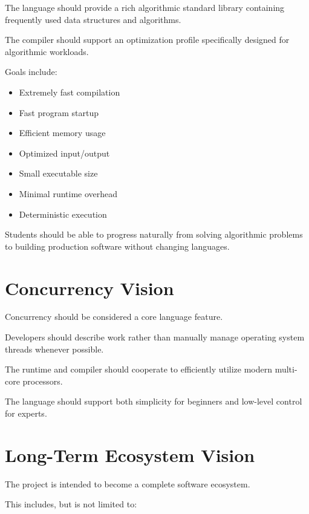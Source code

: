 \documentclass[12pt]{article}
\begin{document}
The language should provide a rich algorithmic standard library containing frequently used data structures and algorithms.

The compiler should support an optimization profile specifically designed for algorithmic workloads.

Goals include:

\begin{itemize}
    \item Extremely fast compilation
    \item Fast program startup
    \item Efficient memory usage
    \item Optimized input/output
    \item Small executable size
    \item Minimal runtime overhead
    \item Deterministic execution
\end{itemize}

Students should be able to progress naturally from solving algorithmic problems to building production software without changing languages.


\section{Concurrency Vision}

Concurrency should be considered a core language feature.

Developers should describe work rather than manually manage operating system threads whenever possible.

The runtime and compiler should cooperate to efficiently utilize modern multi-core processors.

The language should support both simplicity for beginners and low-level control for experts.


\section{Long-Term Ecosystem Vision}

The project is intended to become a complete software ecosystem.

This includes, but is not limited to:
\end{document}
